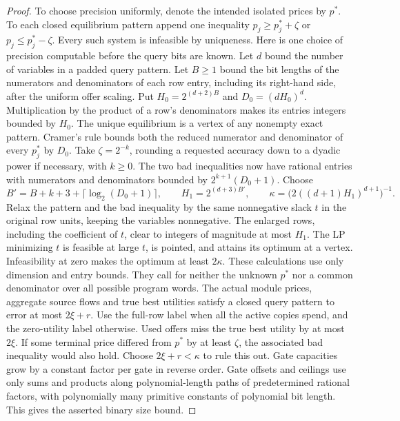 \documentclass[11pt]{article}
\begin{document}
\begin{proof}
To choose precision uniformly, denote the intended isolated prices by
\(p^*\). To each closed equilibrium pattern append one inequality
\(p_j\ge p_j^*+\zeta\) or \(p_j\le p_j^*-\zeta\). Every such system
is infeasible by uniqueness. Here is one choice of precision computable
before the query bits are known. Let \(d\) bound the number of variables
in a padded query pattern. Let \(B\ge1\) bound the bit lengths of the
numerators and denominators of each row entry, including its right-hand
side, after the uniform offer scaling. Put \(H_0=2^{(d+2)B}\) and
\(D_0=(dH_0)^d\). Multiplication by the product of a row's denominators
makes its entries integers bounded by \(H_0\). The unique equilibrium
is a vertex of any nonempty exact pattern. Cramer's rule bounds both
the reduced numerator and denominator of every \(p_j^*\) by \(D_0\).
Take \(\zeta=2^{-k}\), rounding a requested accuracy down to a dyadic
power if necessary, with \(k\ge0\). The two bad inequalities now have
rational entries with numerators and denominators bounded by
\(2^{k+1}(D_0+1)\). Choose
\[
 B'=B+k+3+\lceil\log_2(D_0+1)\rceil,\qquad
 H_1=2^{(d+3)B'},\qquad
 \kappa=\bigl(2((d+1)H_1)^{d+1}\bigr)^{-1}.
\]
Relax the pattern and the bad inequality by the same nonnegative slack
\(t\) in the original row units, keeping the variables nonnegative.
The enlarged rows, including the coefficient of \(t\), clear to integers
of magnitude at most \(H_1\). The LP minimizing \(t\) is feasible
at large \(t\), is pointed, and attains its optimum at a vertex.
Infeasibility at zero makes the optimum at least \(2\kappa\).
These calculations use only dimension and entry bounds. They call for
neither the unknown \(p^*\) nor a common denominator over all possible
program words.
The actual module prices, aggregate source flows and true best utilities
satisfy a closed query pattern to error at most \(2\xi+r\). Use the
full-row label when all the active copies spend, and the zero-utility
label otherwise. Used offers miss the true best utility by at most
\(2\xi\). If some terminal price differed from \(p^*\) by at least
\(\zeta\), the associated bad inequality would also hold. Choose
\(2\xi+r<\kappa\) to rule this out. Gate capacities grow by a constant
factor per gate in reverse order. Gate offsets and ceilings use only
sums and products along polynomial-length paths of predetermined
rational factors, with polynomially many primitive constants of
polynomial bit length. This gives the asserted binary size bound.
\end{proof}
\end{document}
